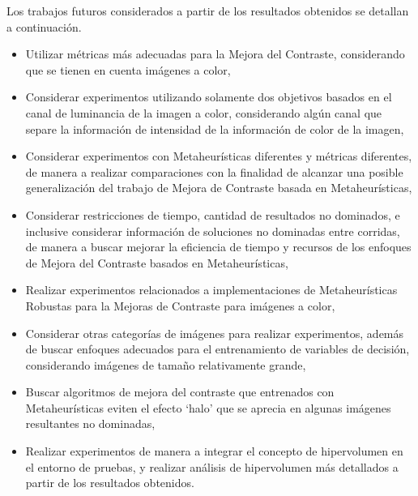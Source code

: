 Los trabajos futuros considerados a partir de los resultados obtenidos se detallan a continuación.

\begin{itemize}
	\item Utilizar métricas más adecuadas para la Mejora del Contraste, considerando que se tienen en cuenta imágenes a color,

	\item Considerar experimentos utilizando solamente dos objetivos basados en el canal de luminancia de la imagen a color, considerando algún canal que separe la información de intensidad de la información de color de la imagen,

	\item Considerar experimentos con Metaheurísticas diferentes y métricas diferentes, de manera a realizar comparaciones con la finalidad de alcanzar una posible generalización del trabajo de Mejora de Contraste basada en Metaheurísticas,

	\item Considerar restricciones de tiempo, cantidad de resultados no dominados, e inclusive considerar información de soluciones no dominadas entre corridas, de manera a buscar mejorar la eficiencia de tiempo y recursos de los enfoques de Mejora del Contraste basados en Metaheurísticas,

	\item Realizar experimentos relacionados a implementaciones de Metaheurísticas Robustas para la Mejoras de Contraste para imágenes a color,

	\item Considerar otras categorías de imágenes para realizar experimentos, además de buscar enfoques adecuados para el entrenamiento de variables de decisión, considerando imágenes de tamaño relativamente grande,

	\item Buscar algoritmos de mejora del contraste que entrenados con Metaheurísticas eviten el efecto `halo' que se aprecia en algunas imágenes resultantes no dominadas,

	\item Realizar experimentos de manera a integrar el concepto de hipervolumen en el entorno de pruebas, y realizar análisis de hipervolumen más detallados a partir de los resultados obtenidos.

\end{itemize}


